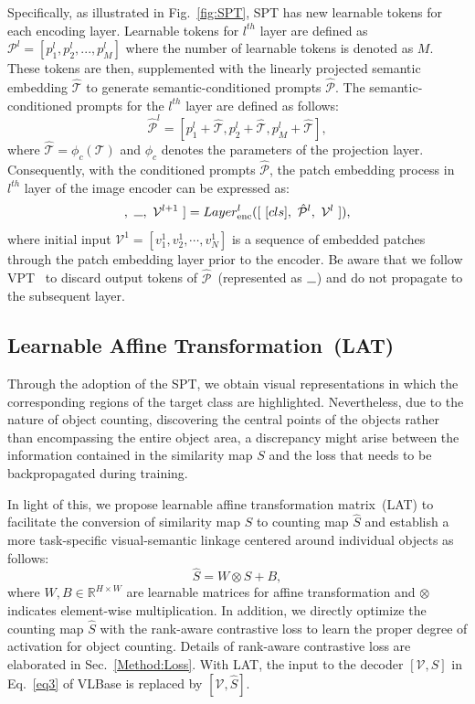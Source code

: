 Specifically, as illustrated in Fig.~\ref{fig:SPT}, SPT has new learnable tokens for each encoding layer.
Learnable tokens for $l^{th}$ layer are defined as $\mathcal{P}^l = [p^l_1, p^l_2, ..., p^l_M]$ where the number of learnable tokens is denoted as $M$.
These tokens are then, supplemented with the linearly projected semantic embedding $\hat{\mathcal{T}}$ to generate semantic-conditioned prompts $\hat{\mathcal{P}}$.
The semantic-conditioned prompts for the $l^{th}$ layer are defined as follows:
\begin{equation}
    \hat{\mathcal{P}}^l = [p_1^l + \hat{\mathcal{T}}, p_2^l + \hat{\mathcal{T}}, p_M^l + \hat{\mathcal{T}}],
\end{equation}
where $\hat{\mathcal{T}} = \phi_c(\mathcal{T})$ and $\phi_c$ denotes the parameters of the projection layer.
Consequently, with the conditioned prompts $\hat{\mathcal{P}}$, the patch embedding process in $l^{th}$ layer of the image encoder can be expressed as:
\begin{equation}
    [\text{ }[cls],~\rule{0.25cm}{0.15mm},~\mathcal{V}^{l+1}\text{ }] = Layer^{l}_{\text{enc}}([\text{ }[cls],~\hat{\mathcal{P}}^{l},~\mathcal{V}^{l}\text{ }]),
\end{equation}
where initial input $\mathcal{V}^1=[v^1_1, v^1_2, \cdots, v^1_N]$ is a sequence of embedded patches through the patch embedding layer prior to the encoder.
Be aware that we follow VPT~\cite{2022vpt} to discard output tokens of $\hat{\mathcal{P}}$~(represented as $\rule{0.25cm}{0.15mm}$) and do not propagate to the subsequent layer.



\subsection{Learnable Affine Transformation~(LAT)}
\label{Method:LAT}
Through the adoption of the SPT, we obtain visual representations in which the corresponding regions of the target class are highlighted.
Nevertheless, due to the nature of object counting, discovering the central points of the objects rather than encompassing the entire object area, a discrepancy might arise between the information contained in the similarity map $S$ and the loss that needs to be backpropagated during training.


In light of this, we propose learnable affine transformation matrix~(LAT) to facilitate the conversion of similarity map $S$ to counting map $\hat{S}$ and establish a more task-specific visual-semantic linkage centered around individual objects as follows: 
\begin{equation}
    \hat{S} = W \otimes S + B,
\end{equation}
where $W, B \in \mathbb{R}^{H \times W}$ are learnable matrices for affine transformation and $\otimes$ indicates element-wise multiplication.
In addition, we directly optimize the counting map $\hat{S}$ with the rank-aware contrastive loss to learn the proper degree of activation for object counting. 
Details of rank-aware contrastive loss are elaborated in Sec.~\ref{Method:Loss}.
With LAT, the input to the decoder $[\mathcal{V}, S]$ in Eq.~\ref{eq3} of VLBase is replaced by $[\mathcal{V}, \hat{S}]$.



